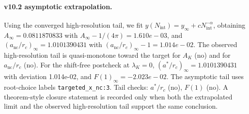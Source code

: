 \paragraph{v10.2 asymptotic extrapolation.}
Using the converged high-resolution tail, we fit $y(N_{\mathrm{int}})=y_{\infty}+cN_{\mathrm{int}}^{-\alpha}$, obtaining $A_\infty=0.0811870833$ with $A_\infty-1/(4\pi)=1.610e-03$, and $(a_{\mathrm{nc}}/r_c)_\infty=1.0101390431$ with $(a_{\mathrm{nc}}/r_c)_\infty-1=1.014e-02$. The observed high-resolution tail is quasi-monotone toward the target for $A_K$ (no) and for $a_{\mathrm{nc}}/r_c$ (no). For the shift-free postcheck at $\lambda_K=0$, $(a^*/r_c)_\infty=1.0101390431$ with deviation 1.014e-02, and $F(1)_\infty=-2.023e-02$. The asymptotic tail uses root-choice labels \texttt{targeted_x_nc:3}. Tail checks: $a^*/r_c$ (no), $F(1)$ (no). A theorem-style closure statement is recorded only when both the extrapolated limit and the
observed high-resolution tail support the same conclusion.
